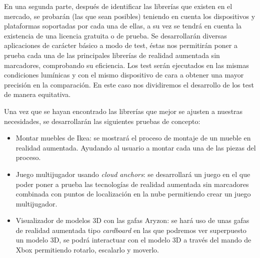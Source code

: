En una segunda parte, después de identificar las librerías que existen en el mercado, se probarán (las que sean posibles) teniendo en cuenta los dispositivos y plataformas soportadas por cada una de ellas, a su vez se tendrá en cuenta la existencia de una licencia gratuita o de prueba. Se desarrollarán diversas aplicaciones de carácter básico a modo de test, éstas nos permitirán poner a prueba cada una de las principales librerías de realidad aumentada sin marcadores, comprobando su eficiencia. Los test serán ejecutados en las mismas condiciones lumínicas y con el mismo dispositivo de cara a obtener una mayor precisión en la comparación. En este caso nos dividiremos el desarrollo de los test de manera equitativa.\vspace{\baselineskip}

Una vez que se hayan encontrado las librerías que mejor se ajusten a nuestras necesidades, se desarrollarán las siguientes pruebas de concepto:
\begin{itemize}
\item Montar muebles de Ikea: se mostrará el proceso de montaje de un mueble en realidad aumentada. Ayudando al usuario a montar cada una de las piezas del proceso.
\item Juego multijugador usando \textit{cloud anchors}: se desarrollará un juego en el que poder poner a prueba las tecnologías de realidad aumentada sin marcadores combinada con puntos de localización en la nube permitiendo crear un juego multijugador.
\item Visualizador de modelos 3D con las gafas Aryzon: se hará uso de unas gafas de realidad aumentada tipo \textit{cardboard} en las que podremos ver superpuesto un modelo 3D, se podrá interactuar con el modelo 3D a través del mando de Xbox permitiendo rotarlo, escalarlo y moverlo.
\end{itemize}